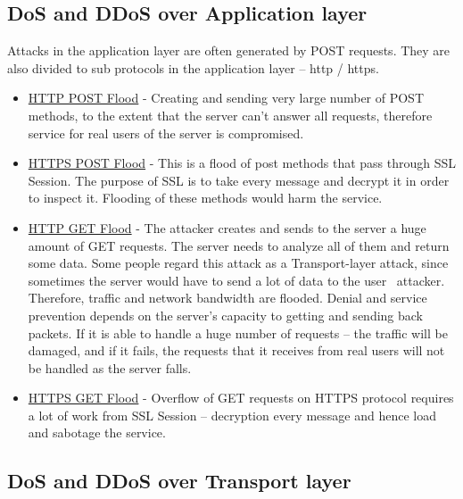 \documentclass{report}
\begin{document}
\subsection {DoS and DDoS over Application layer} 
 \hfill \break Attacks in the application layer are often generated by POST requests. They are also divided to sub protocols in the application layer – http / https.
\begin{itemize}
\item\underline {HTTP POST Flood} 
- Creating and sending very large number of POST methods, to the extent that the server can't answer all requests, therefore service for real users of the server is compromised.

\item\underline{HTTPS POST Flood} - This is a flood of post methods that pass through SSL Session. The purpose of SSL is to take every message and decrypt it in order to inspect it. Flooding of these methods would harm the service.
\newpage
\item\underline{HTTP GET Flood} - The attacker creates and sends to the server a huge amount of GET requests. The server needs to analyze all of them and return some data. Some people regard this attack as a Transport-layer attack, since sometimes the server would have to send a lot of data to the user \ attacker. Therefore, traffic and network bandwidth are flooded. Denial and service prevention depends on the server’s capacity to getting and sending back packets. If it is able to handle a huge number of requests – the traffic will be damaged, and if it fails, the requests that it receives from real users will not be handled as the server falls.

\item\underline{HTTPS GET Flood} - Overflow of GET requests on HTTPS protocol requires a lot of work from SSL Session – decryption every message and hence load and sabotage the service.
\end{itemize}
\hfill \break
\subsection {DoS and DDoS over Transport layer} 
\end{document}
